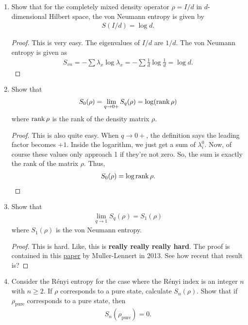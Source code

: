 \documentclass{book}
\theoremstyle{definition}
\newcommand{\f}[2]{\frac{#1}{#2}}
\begin{document}
\begin{enumerate}
	\item Show that for the completely mixed density operator $\rho = I/d$ in $d$-dimensional Hilbert space, the von Neumann entropy is given by
	\begin{align}
	S(I/d) = \log d.
	\end{align}
	
	\begin{proof}
		This is very easy. The eigenvalues of $I/d$ are $1/d$. The von Neumann entropy is given as 
		\begin{align}
		S_{vn} = -\sum \lambda_x \log \lambda_x = -\sum \f{1}{d}\log \f{1}{d} = \log d.
		\end{align}
	\end{proof}
	
	\item Show that 
	\begin{align}
	S_0(\rho) =\lim_{q\to 0+} S_q(\rho) =\log (\rank \rho)
	\end{align}
	where $\rank \rho$ is the rank of the density matrix $\rho$.
	
	\begin{proof}
		This is also quite easy. When $q \to 0+$, the definition says the leading factor becomes $+1$. Inside the logarithm, we just get a sum of $\lambda_i^0$. Now, of course these values only approach 1 if they're not zero. So, the sum is exactly the rank of the matrix $\rho$. Thus, 
		\begin{align}
		S_0(\rho) = \log \rank \rho.
		\end{align} 
	\end{proof}
	
	
	\item Show that 
	\begin{align}
	\lim_{q\to 1} S_q(\rho) = S_1(\rho)
	\end{align}
	where $S_1(\rho)$ is the von Neumann entropy. 
	
	\begin{proof}
		This is hard. Like, this is \textbf{really really really hard}. The proof is contained in this \href{https://arxiv.org/pdf/1306.3142.pdf}{\underline{paper}} by Muller-Lennert in 2013. See how recent that result is?
	\end{proof}
	
	
	
	
	\item Consider the R\'enyi entropy for the case where the R\'enyi index is an integer $n$ with $n \geq 2$. If $\rho$ corresponds to a pure state, calculate $S_n(\rho)$. Show that if $\rho_\text{pure}$ corresponds to a pure state, then
	\begin{align}
	S_n(\rho_\text{pure}) = 0.
	\end{align}
	

\end{enumerate}
\end{document}
